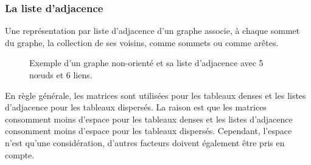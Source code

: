 \subsubsection{La liste d’adjacence}
Une représentation par liste d'adjacence d'un graphe associe, à chaque sommet du graphe, la collection de 
ses voisins, comme sommets ou comme arêtes.\\
\begin{figure}[h]
	\centering
	\caption{Exemple d'un graphe non-orienté et sa liste d'adjacence avec 5 nœuds et 6 liens.}
	\label{matrice d'adjacence1}
\end{figure}

En règle générale, les matrices sont utilisées pour les tableaux denses et les listes d'adjacence pour les 
tableaux dispersés. La raison est que les matrices consomment moins d'espace pour les tableaux denses et les listes
d'adjacence consomment moins d'espace pour les tableaux dispersés. Cependant, l'espace n'est qu'une considération, d'autres
facteurs doivent également être pris en compte.


